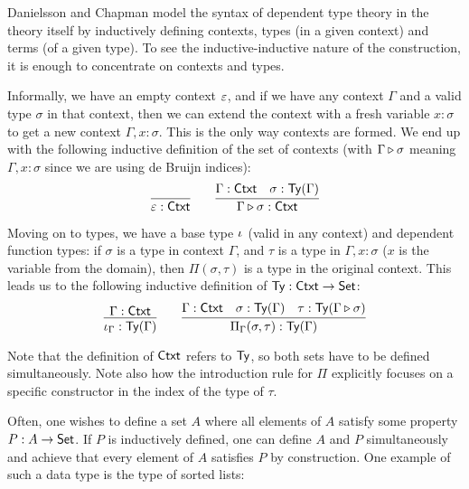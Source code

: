 \documentclass{article}
\begin{document}
\begin{example}
\label{ex:ctxt-type}

Danielsson \cite{danielsson2007formalisation} and Chapman
\cite{chapman2009eatitself} model the syntax of dependent type theory
in the theory itself by inductively defining contexts, types (in a
given context) and terms (of a given type). To see the
inductive-inductive nature of the construction, it is enough to
concentrate on contexts and types.

Informally, we have an empty context $\varepsilon$, and if we have any
context $\Gamma$ and a valid type $\sigma$ in that context, then we
can extend the context with a fresh variable $x : \sigma$ to get a new
context $\Gamma, x : \sigma$. This is the only way contexts are
formed. We end up with the following inductive definition of the set
of contexts (with $\Gamma \triangleright \sigma$ meaning $\Gamma, x :
\sigma$ since we are using de Bruijn indices):
\[
\infer{\emptyCtxt : \Ctxt}{} \qquad
\infer{\consCtxt{\Gamma}{\sigma} : \Ctxt}{\Gamma : \Ctxt & \sigma : \Ty(\Gamma)}
\]

Moving on to types, we have a base type $\iota_{}$ (valid in any
context) and dependent function types: if $\sigma$ is a type in
context $\Gamma$, and $\tau$ is a type in $\Gamma, x : \sigma$ ($x$ is
the variable from the domain), then $\Pi(\sigma, \tau)$ is a type in
the original context. This leads us to the following inductive
definition of $\mathsf{Ty} : \mathsf{Ctxt} \to \mathsf{Set}$:
\[
\infer{\baseTy{\Gamma} : \Ty(\Gamma)}{\Gamma : \Ctxt} \qquad
\infer{\piTy{\Gamma}{\sigma}{\tau} : \Ty(\Gamma)}{\Gamma : \Ctxt
                    & \sigma : \Ty(\Gamma)
                    & \tau : \Ty(\consCtxt{\Gamma}{\sigma})}
\]

Note that the definition of $\mathsf{Ctxt}$ refers to $\mathsf{Ty}$, so both sets have
to be defined simultaneously. Note also how the introduction rule for
$\Pi$ explicitly focuses on a specific constructor in the index of the
type of $\tau$. 
\blackqed
\end{example}

Often, one wishes to define a set $A$ where all elements of $A$
satisfy some property $P : A \to \mathsf{Set}$. If $P$ is inductively defined,
one can define $A$ and $P$ simultaneously and achieve that every
element of $A$ satisfies $P$ by construction. One example of such a
data type is the type of sorted lists:
\end{document}
